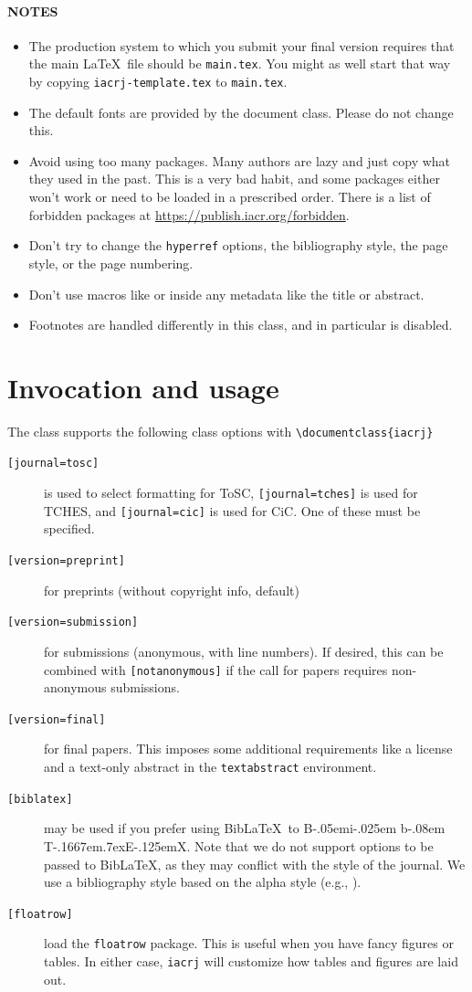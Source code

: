 \documentclass[journal=cic,version=preprint]{iacrj}
\def\BibTeX{{\rm B\kern-.05em{\sc i\kern-.025em b}\kern-.08em
    T\kern-.1667em\lower.7ex\hbox{E}\kern-.125emX}}
\def\BibLaTeX{Bib\LaTeX}
\begin{document}
\paragraph*{NOTES}
\begin{itemize}
\item The production system to which you submit your final version requires
  that the main \LaTeX\ file should be \texttt{main.tex}. You might as
  well start that way by copying \texttt{iacrj-template.tex} to \texttt{main.tex}.
\item The default fonts are provided by the document class. Please do not
  change this.
\item Avoid using too many packages. Many authors are lazy and just
  copy what they used in the past. This is a very bad habit, and some
  packages either won't work or need to be loaded in a prescribed
  order. There is a list of forbidden packages at \url{https://publish.iacr.org/forbidden}.
\item Don't try to change the \texttt{hyperref} options, the bibliography style,
  the page style, or the page numbering.
\item Don't use macros like  or  inside any
  metadata like the title or abstract.
\item Footnotes are handled differently in this class, and in
  particular  is disabled.
\end{itemize}

\section{Invocation and usage}

The class supports the following class options with \verb+\documentclass{iacrj}+
\begin{description}
\item[\texttt{[journal=tosc]}] is used to select formatting for ToSC,
\texttt{[journal=tches]} is used for TCHES, and \texttt{[journal=cic]}
is used for CiC. One of these must be specified.
\item[\texttt{[version=preprint]}] for preprints (without copyright info, default)
\item[\texttt{[version=submission]}] for submissions (anonymous, with
  line numbers).  If desired, this can be combined with
  \texttt{[notanonymous]} if the call for papers requires
  non-anonymous submissions.
\item[\texttt{[version=final]}] for final papers. This imposes some
  additional requirements like a license and a text-only abstract
  in the \texttt{textabstract} environment.
\item[\texttt{[biblatex]}] may be used if you prefer using
  \BibLaTeX\ to \BibTeX. Note that we do not support options to be
  passed to \BibLaTeX, as they may conflict with the style of the journal. We use
  a bibliography style based on the alpha style (e.g., \cite{RSA78}).
\item[\texttt{[floatrow]}] load the \texttt{floatrow} package. This is useful
  when you have fancy figures or tables. In either case, \texttt{iacrj}
  will customize how tables and figures are laid out.
\end{description}
\end{document}
